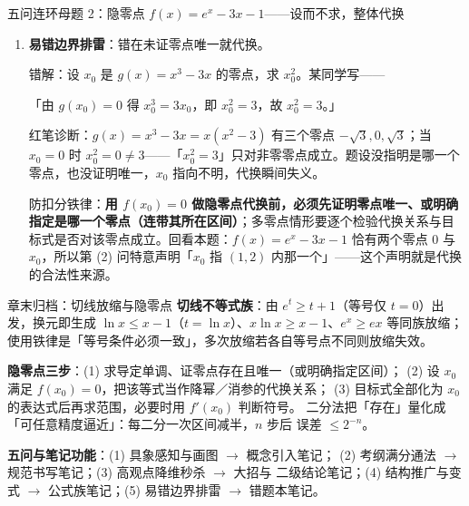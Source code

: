 \begin{methodbox}{五问连环母题 2：隐零点 $f(x)=e^x-3x-1$——设而不求，整体代换}
\begin{enumerate}[label=(\arabic*), itemsep=5pt]
\begin{advancedonly}
故 $x_0\in\tk{(1.875,\,1.9375)}$，约为 $1.90$；每二分一次，区间长度减半，$n$ 步后误差不超过 $2^{-n}$。

动机：二分法把「存在」量化成「可任意精度逼近」；这也是检查答案合理性的手段（例如验证 $e^{1.9}\approx6.69$ 与 $3\cdot1.9+1=6.7$ 几乎相等）。
\end{advancedonly}

\item \textbf{易错边界排雷}：错在未证零点唯一就代换。

错解：设 $x_0$ 是 $g(x)=x^3-3x$ 的零点，求 $x_0^2$。某同学写——

「由 $g(x_0)=0$ 得 $x_0^3=3x_0$，即 $x_0^2=3$，故 $x_0^2=3$。」

\ifteacher
{\small\textcolor{second}{红笔诊断：$g(x)=x^3-3x=x(x^2-3)$ 有三个零点 $-\sqrt3,0,\sqrt3$；当 $x_0=0$ 时 $x_0^2=0\ne3$——「$x_0^2=3$」只对非零零点成立。题设没指明是哪一个零点，也没证明唯一，$x_0$ 指向不明，代换瞬间失义。}}
\else
\noteblank[5ex]
\fi

防扣分铁律：\textbf{用 $f(x_0)=0$ 做隐零点代换前，必须先证明零点唯一、或明确指定是哪一个零点（连带其所在区间）}；多零点情形要逐个检验代换关系与目标式是否对该零点成立。回看本题：$f(x)=e^x-3x-1$ 恰有两个零点 $0$ 与 $x_0$，所以第 (2) 问特意声明「$x_0$ 指 $(1,2)$ 内那一个」——这个声明就是代换的合法性来源。

\end{enumerate}
\end{methodbox}

\begin{notezone}{章末归档：切线放缩与隐零点}
\textbf{切线不等式族}：由 $e^t\ge t+1$（等号仅 $t=0$）出发，换元即生成
$\ln x\le x-1$（$t=\ln x$）、$x\ln x\ge x-1$、$e^x\ge ex$ 等同族放缩；
使用铁律是「等号条件必须一致」，多次放缩若各自等号点不同则放缩失效。

\textbf{隐零点三步}：(1) 求导定单调、证零点存在且唯一（或明确指定区间）；
(2) 设 $x_0$ 满足 $f(x_0)=0$，把该等式当作降幂／消参的代换关系；
(3) 目标式全部化为 $x_0$ 的表达式后再求范围，必要时用 $f'(x_0)$ 判断符号。
二分法把「存在」量化成「可任意精度逼近」：每二分一次区间减半，$n$ 步后
误差 $\le 2^{-n}$。

\textbf{五问与笔记功能}：(1) 具象感知与画图 $\to$ 概念引入笔记；
(2) 考纲满分通法 $\to$ 规范书写笔记；(3) 高观点降维秒杀 $\to$ 大招与
二级结论笔记；(4) 结构推广与变式 $\to$ 公式族笔记；(5) 易错边界排雷 $\to$ 错题本笔记。
\end{notezone}
